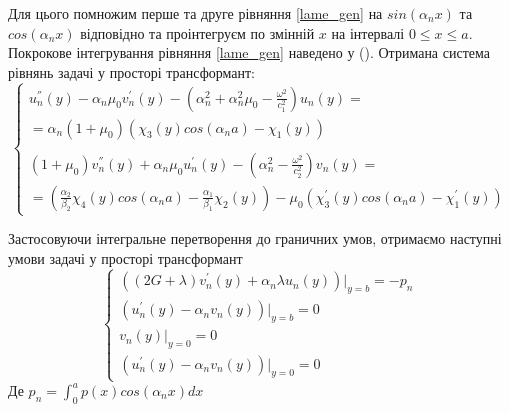 Для цього помножим перше та друге рівняння \eqref{lame_gen} на $sin(\alpha_n x)$ та $cos(\alpha_n x)$ відповідно та проінтегруєм по змінній $x$ на інтервалі $0 \le x \le a$.
Покрокове інтегрування рівняння \eqref{lame_gen} наведено у ().
Отримана система рівнянь задачі у просторі трансформант:
\begin{equation}\label{transf_gen}
    \begin{cases}
        u_n^{''}(y) - \alpha_n \mu_0 v_n^{'}(y) - (\alpha_n^2 + \alpha_n^2 \mu_0 - \frac{\omega^2}{c_1^2}) u_n(y) = \\
        = \alpha_n(1 + \mu_0)(\chi_3(y) cos(\alpha_n a) - \chi_1(y)) \\
        \\
        (1 + \mu_0) v_n^{''}(y) + \alpha_n \mu_0 u_n^{'}(y) - (\alpha_n^2 - \frac{\omega^2}{c_2^2}) v_n(y) = \\
        = (\frac{\alpha_2}{\beta_2}\chi_4(y) cos(\alpha_n a) - \frac{\alpha_1}{\beta_1}\chi_2(y)) - \mu_0 (\chi_3^{'}(y) cos(\alpha_n a) -\chi_1^{'}(y))
    \end{cases}
\end{equation}

Застосовуючи інтегральне перетворення до граничних умов,
отримаємо наступні умови задачі у просторі трансформант
\begin{equation}\label{transf_bound_gen}
    \begin{cases}
        \left( (2G + \lambda)v_n^{'}(y) + \alpha_n \lambda u_n(y) \right)|_{y=b} = -p_n \\
        \left(u_n^{'}(y) - \alpha_n v_n(y)  \right)|_{y=b} = 0 \\
        v_n(y)|_{y=0} = 0 \\
        \left(u_n^{'}(y) - \alpha_n v_n(y)  \right)|_{y=0} = 0
    \end{cases}
\end{equation}
Де $p_n = \int_{0}^{a} p(x) cos(\alpha_n x) dx$

